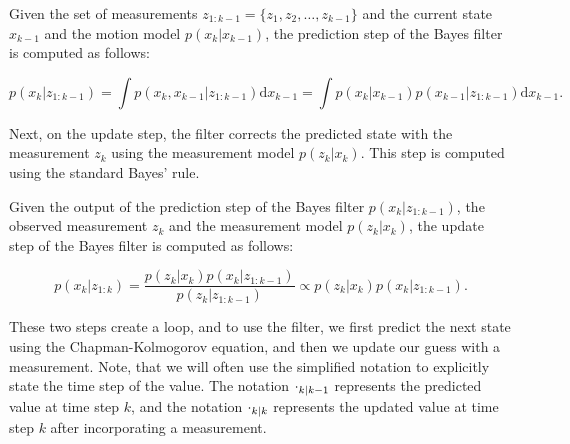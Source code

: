 \begin{theorem}\label{theorem:bayes-filter-predict}\label{theorem:chapman-kolmogorov}
    Given the set of measurements $z_{1:k-1} = \{z_1, z_2, \ldots, z_{k-1}\}$ 
    and the current state $x_{k-1}$ and the motion model $p(x_k | x_{k-1})$, 
    the prediction step of the Bayes filter is computed as follows:

    \begin{equation}
        p\left({x}_k | {z}_{1: k-1}\right)
        = \int 
            p\left(
                {x}_k, {x}_{k-1} | {z}_{1: k-1}
            \right)
            \mathrm{d} {x}_{k-1}
        = \int
            p\left(
                {x}_k | {x}_{k-1}\right
            ) p\left(
                {x}_{k-1} | {z}_{1: k-1}
            \right)
            \mathrm{d} {x}_{k-1}.
    \end{equation}
\end{theorem}

Next, on the update step, the filter corrects the predicted state with the 
measurement $z_k$ using the measurement model $p(z_k | x_k)$. This step is
computed using the standard Bayes' rule.

\begin{theorem}\label{theorem:bayes-filter-update}
    Given the output of the prediction step of the Bayes filter 
    $p\left({x}_k | {z}_{1: k-1}\right)$, the observed measurement $z_k$
    and the measurement model $p(z_k | x_k)$, the update step of the Bayes
    filter is computed as follows:
    
    \begin{equation}
        p\left({x}_k | {z}_{1: k}\right)=\frac{p\left({z}_k | {x}_k\right) p\left({x}_k | {z}_{1: k-1}\right)}{p\left({z}_k | {z}_{1: k-1}\right)} \propto p\left({z}_k | {x}_k\right) p\left({x}_k | {z}_{1: k-1}\right).
    \end{equation}
\end{theorem}

These two steps create a loop, and to use the filter, we first predict the next state using the Chapman-Kolmogorov equation, and then we update our guess with a measurement. Note, that we will often use the simplified notation to explicitly state the time step of the value. The notation $\vecat{\cdot}{k|k-1}$ represents the predicted value at time step $k$, and the notation $\vecat{\cdot}{k|k}$ represents the updated value at time step $k$ after incorporating a measurement.

